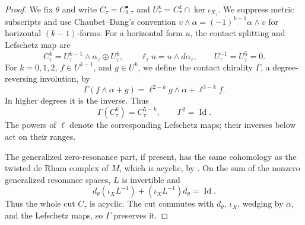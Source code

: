 \documentclass[11pt,letterpaper,reqno]{amsart}
\theoremstyle{remark}
\newcommand{\Id}{\operatorname{Id}}
\begin{document}
\begin{proof}
We fix $\theta$ and write
$C_\tau=C^\bullet_{\theta,\tau}$ and
$U^k_\tau=C^k_\tau\cap\ker\iota_{X_\tau}$.
We suppress metric subscripts and use Chaubet--Dang's convention
$v\wedge\alpha=(-1)^{k-1}\alpha\wedge v$ for horizontal $(k-1)$-forms.
For a horizontal form $u$, the contact splitting and Lefschetz map are
\[
 C^k_\tau=U^{k-1}_\tau\wedge\alpha_\tau\oplus U^k_\tau,
 \qquad \ell_\tau u=u\wedge d\alpha_\tau,
 \qquad U^{-1}_\tau=U^5_\tau=0.
\]
For $k=0,1,2$, $f\in U^{k-1}$, and $g\in U^k$, we define the contact
chirality $\Gamma$, a degree-reversing involution, by
\begin{equation}\label{xp:contact-chirality}
 \Gamma(f\wedge\alpha+g)
 =\ell^{2-k}g\wedge\alpha+\ell^{3-k}f.
\end{equation}
In higher degrees it is the inverse. Thus
\[
 \Gamma(C^k_\tau)=C^{5-k}_\tau,\qquad\Gamma^2=\Id.
\]
The powers of $\ell$ denote the corresponding Lefschetz maps;
their inverses below act on their ranges.

The generalized zero-resonance part, if present, has the same cohomology as the
twisted de Rham complex of $M$, which is acyclic, by
\cite[Theorem~2.1]{DR}. On the sum of the
nonzero generalized resonance spaces, $L$ is invertible and
\[
 d_\theta(\iota_XL^{-1})+(\iota_XL^{-1})d_\theta=\Id.
\]
Thus the whole cut $C_\tau$ is acyclic. The cut commutes with $d_\theta$,
$\iota_X$, wedging by $\alpha$, and the Lefschetz maps, so
$\Gamma$ preserves it.


\end{proof}
\end{document}
